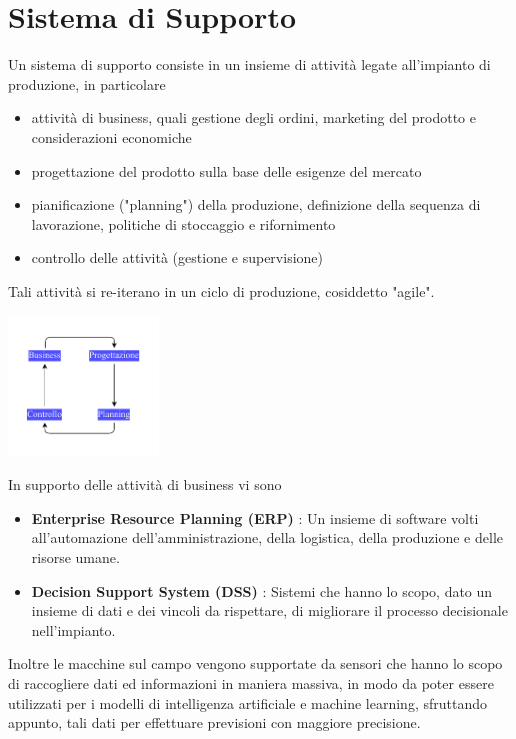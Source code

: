 \documentclass[10pt, letterpaper]{report}
\begin{document}
\section{Sistema di Supporto}
Un sistema di supporto consiste in un insieme di attività legate all'impianto di produzione, in particolare\begin{itemize}
    \item attività di business, quali gestione degli ordini, marketing del prodotto e considerazioni economiche 
    \item progettazione del prodotto sulla base delle esigenze del mercato 
    \item pianificazione ("planning") della produzione, definizione della sequenza di lavorazione, politiche 
    di stoccaggio e rifornimento 
    \item controllo delle attività (gestione e supervisione)
\end{itemize}
Tali attività si re-iterano in un ciclo di produzione, cosiddetto "agile".
\begin{center}
    \includegraphics[width=0.3\textwidth ]{images/sistSupp.pdf}
\end{center}
In supporto delle attività di business vi sono \begin{itemize}
    \item \textbf{Enterprise Resource Planning (ERP)} : Un insieme di software volti all'automazione 
    dell'amministrazione, della logistica, della produzione e delle risorse umane. 
    \item \textbf{Decision Support System (DSS)} : Sistemi che hanno lo scopo, dato un insieme di dati 
    e dei vincoli da rispettare, di migliorare il processo decisionale nell'impianto.
\end{itemize}
Inoltre le macchine sul campo vengono supportate da sensori che hanno lo scopo di raccogliere dati ed informazioni 
in maniera massiva, in modo da poter essere utilizzati per i modelli di intelligenza artificiale e machine learning, 
sfruttando appunto,  tali dati per effettuare previsioni con maggiore precisione.
\end{document}
